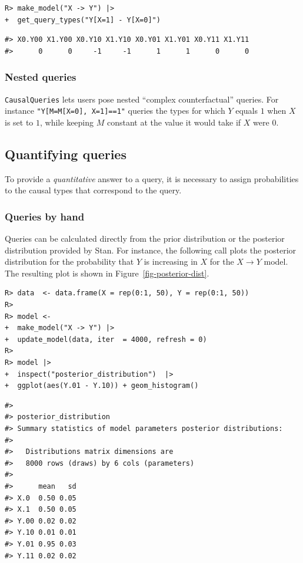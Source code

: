 \documentclass[
  11pt,
  article]{jss}
\begin{document}
\begin{verbatim}
R> make_model("X -> Y") |> 
+  get_query_types("Y[X=1] - Y[X=0]")
\end{verbatim}

\begin{verbatim}
#> X0.Y00 X1.Y00 X0.Y10 X1.Y10 X0.Y01 X1.Y01 X0.Y11 X1.Y11 
#>      0      0     -1     -1      1      1      0      0
\end{verbatim}

\subsubsection{Nested queries}\label{nested-queries}

\texttt{CausalQueries} lets users pose nested ``complex counterfactual''
queries. For instance \texttt{"Y{[}M=M{[}X=0{]},\ X=1{]}==1"} queries
the types for which \(Y\) equals \(1\) when \(X\) is set to \(1\), while
keeping \(M\) constant at the value it would take if \(X\) were \(0\).

\subsection{Quantifying queries}\label{quantifying-queries}

To provide a \emph{quantitative} answer to a query, it is necessary to
assign probabilities to the causal types that correspond to the query.

\subsubsection{Queries by hand}\label{queries-by-hand}

Queries can be calculated directly from the prior distribution or the
posterior distribution provided by Stan. For instance, the following
call plots the posterior distribution for the probability that \(Y\) is
increasing in \(X\) for the \(X \rightarrow Y\) model. The resulting
plot is shown in Figure~\ref{fig-posterior-dist}.

\begin{verbatim}
R> data  <- data.frame(X = rep(0:1, 50), Y = rep(0:1, 50))
R> 
R> model <- 
+  make_model("X -> Y") |>
+  update_model(data, iter  = 4000, refresh = 0)
R> 
R> model |> 
+  inspect("posterior_distribution")  |> 
+  ggplot(aes(Y.01 - Y.10)) + geom_histogram() 
\end{verbatim}

\begin{verbatim}
#> 
#> posterior_distribution
#> Summary statistics of model parameters posterior distributions:
#> 
#>   Distributions matrix dimensions are 
#>   8000 rows (draws) by 6 cols (parameters)
#> 
#>      mean   sd
#> X.0  0.50 0.05
#> X.1  0.50 0.05
#> Y.00 0.02 0.02
#> Y.10 0.01 0.01
#> Y.01 0.95 0.03
#> Y.11 0.02 0.02
\end{verbatim}
\end{document}
